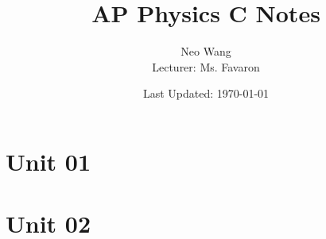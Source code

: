 \documentclass{scrreprt}
\title{AP Physics C Notes}
\author{Neo Wang \\ Lecturer: Ms. Favaron}
\date{Last Updated: \today}
\begin{document}
\maketitle
\setcounter{tocdepth}{2}
\tableofcontents

\section{Unit 01}


\section{Unit 02}

\end{document}
